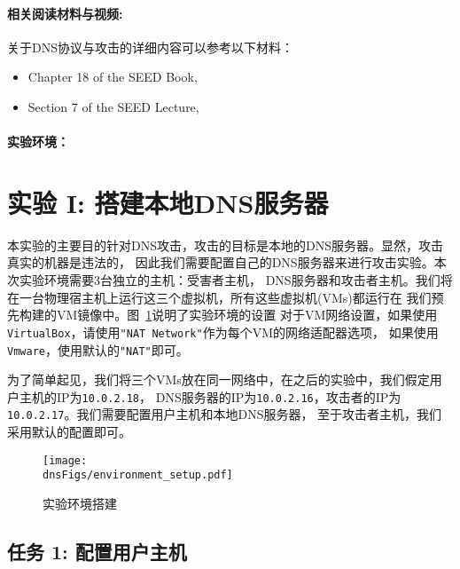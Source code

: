 \paragraph{相关阅读材料与视频:}
关于DNS协议与攻击的详细内容可以参考以下材料：

\begin{itemize}
\item Chapter 18 of the SEED Book, \seedbook
\item Section 7 of the SEED Lecture, \seedisvideo
\end{itemize}



\paragraph{实验环境：} \seedenvironment



\section{实验 I: 搭建本地DNS服务器}

本实验的主要目的针对DNS攻击，攻击的目标是本地的DNS服务器。显然，攻击真实的机器是违法的，
因此我们需要配置自己的DNS服务器来进行攻击实验。本次实验环境需要3台独立的主机：受害者主机，
DNS服务器和攻击者主机。我们将在一台物理宿主机上运行这三个虚拟机，所有这些虚拟机(VMs)都运行在
我们预先构建的\ubuntu VM镜像中。图~\ref{dns:fig:environment}说明了实验环境的设置
对于VM网络设置，如果使用{\tt VirtualBox}，请使用{\tt "NAT Network"}作为每个VM的网络适配器选项，
如果使用{\tt Vmware}，使用默认的{\tt "NAT"}即可。


为了简单起见，我们将三个VMs放在同一网络中，在之后的实验中，我们假定用户主机的IP为{\tt 10.0.2.18}，
DNS服务器的IP为{\tt 10.0.2.16}，攻击者的IP为{\tt 10.0.2.17}。我们需要配置用户主机和本地DNS服务器，
至于攻击者主机，我们采用默认的配置即可。


\begin{figure}[htb]
\centering
\texttt{[image: \\dnsFigs/environment\_setup.pdf]}
\caption{实验环境搭建}
\label{dns:fig:environment}
\end{figure}


\subsection{任务 1: 配置用户主机}

